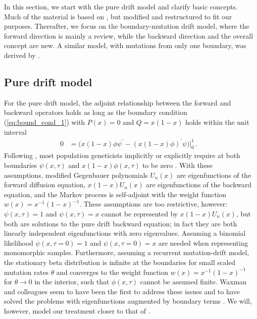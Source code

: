 \documentclass[preprint]{elsarticle}
\begin{document}
In this section, we start with the pure drift model and clarify basic concepts. Much of the material is based on \citet{Tran14a}, but modified and restructured to fit our purposes. Thereafter, we focus on the boundary-mutation drift model, where the forward direction is mainly a review, while the backward direction and the overall concept are new. A similar model, with mutations from only one boundary, was derived by \citet{Evan07}.

\subsection{Pure drift model}

For the pure drift model, the adjoint relationship between the forward and backward operators holds as long as the boundary condition (\ref{eq:bound_cond_1}) with $P(x)=0$ and $Q=x(1-x)$ holds within the unit interval 
\begin{equation}\label{eq:bound_pure_drift}
\begin{split}
    0&=\big(x(1-x)\phi\psi^{'}-(x(1-x)\phi)^{'}\psi\big)\big|_0^1\,.    
\end{split}
\end{equation}
Following \citet{Kimu55}, most population geneticists implicitly or explicitly require at both boundaries $\psi(x,\tau)$ and $x(1-x)\phi(x,\tau)$ to be zero \citep[see also][]{Ewen04,Song12}. With these assumptions, modified Gegenbauer polynomials $U_n(x)$ are eigenfunctions of the forward diffusion equation, $x(1-x)U_n(x)$ are eigenfunctions of the backward equation, and the Markov process is self-adjoint with the weight function $w(x)=x^{-1}(1-x)^{-1}$. These assumptions are too restrictive, however: $\psi(x,\tau)=1$ and $\psi(x,\tau)=x$ cannot be represented by $x(1-x)U_n(x)$, but both are solutions to the pure drift backward equation; in fact they are both linearly independent eigenfunctions with zero eigenvalues. Assuming a binomial likelihood $\psi(x,\tau=0)=1$ and $\psi(x,\tau=0)=x$ are needed when representing monomorphic samples. Furthermore, assuming a recurrent mutation-drift model, the stationary beta distribution is infinite at the boundaries for small scaled mutation rates $\theta$ and converges to the weight function $w(x)=x^{-1}(1-x)^{-1}$ for $\theta\to0$ in the interior, such that $\phi(x,\tau)$ cannot be assumed finite. Waxman and colleagues \citep{McKa07,Waxm11} seem to have been the first to address these issues and to have solved the problems with eigenfunctions augmented by boundary terms \citep{McKa07,Waxm11}. We will, however, model our treatment closer to that of \citet{Tran14a}.
\end{document}
